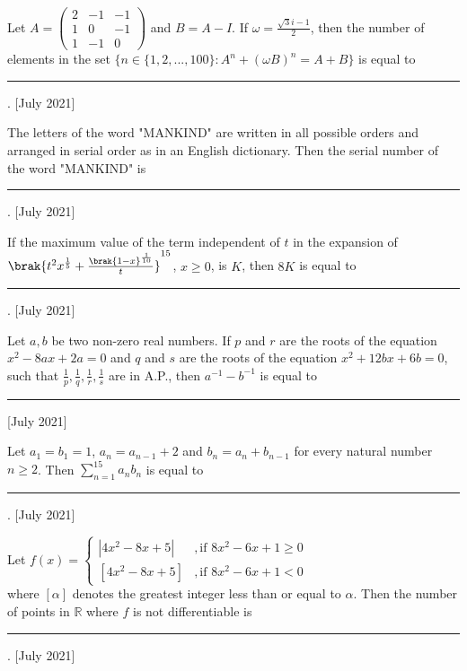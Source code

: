 \iffalse
\title{2021}
\author{AI24BTECH11012}
\section{integer}
\fi
  
  
  \item Let $A = \begin{pmatrix} 2 & -1 & -1 \\ 1 & 0 & -1 \\ 1 & -1 & 0 \end{pmatrix}$ and $B = A - I$. If $\omega = \frac{\sqrt{3}i - 1}{2}$, then the number of elements in the set $\{n \in \{1, 2, ..., 100\} : A^n + (\omega B)^n = A + B\}$ is equal to \rule{2.5cm}{0.4pt}.
  \hfill{[July 2021]}
    
    \item The letters of the word "MANKIND" are written in all possible orders and arranged in serial order as in an English dictionary. Then the serial number of the word "MANKIND" is \rule{2.5cm}{0.4pt}.
    \hfill{[July 2021]}
    
    \item If the maximum value of the term independent of $t$ in the expansion of $\brak{t^{2}x^{\frac{1}{5}}+\frac{\brak{1-x}^{\frac{1}{10}}}{t}}^{15}$, $x \geq 0$, is $K$, then $8K$ is equal to \rule{2.5cm}{0.4pt}.
    \hfill{[July 2021]}
    
    \item Let $a, b$ be two non-zero real numbers. If $p$ and $r$ are the roots of the equation $x^2 - 8ax + 2a = 0$ and $q$ and $s$ are the roots of the equation $x^2 + 12bx + 6b = 0$, such that $\frac{1}{p}, \frac{1}{q}, \frac{1}{r}, \frac{1}{s}$ are in A.P., then $a^{-1} - b^{-1}$ is equal to \rule{2.5cm}{0.4pt}
    \hfill{[July 2021]}
    
    \item Let $a_1 = b_1 = 1$, $a_n = a_{n-1} + 2$ and $b_n = a_n + b_{n-1}$ for every natural number $n \geq 2$. Then $\sum_{n=1}^{15} a_n b_n$ is equal to \rule{2.5cm}{0.4pt}.
    \hfill{[July 2021]}
    
    \item Let $    f(x) =
    \begin{cases}
        |4x^2-8x+5| & , \text{if } 8x^2-6x+1 \geq 0 \\
        [4x^2-8x+5] & , \text{if } 8x^2-6x+1 < 0
    \end{cases}$\\where $[\alpha]$ denotes the greatest integer less than or equal to $\alpha$. Then the number of points in $\mathbb{R}$ where $f$ is not differentiable is \rule{2.5cm}{0.4pt}.
    \hfill{[July 2021]}
    
